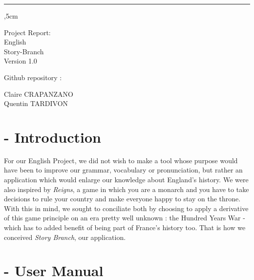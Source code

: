 \documentclass{scrreprt}
\date{}
\def\myversion{1.0}
\begin{document}
%
\thispagestyle{empty}
\begin{flushright}
    \rule{15cm}{3pt},5cm
    \begin{bfseries}
        \Huge{Project Report: \\ English}\\
        \vspace{2cm}
        \vspace{2cm}
        \Huge{Story-Branch}\\

        \vspace{0.5cm}
        \LARGE{Version \myversion}\\
        \begin{flushleft}
            \vspace{8cm}
            Github repository : \href{https://github.com/quentin-tardivon/Story-Branch}{\faGithub}~\\
            \vspace{0.5cm}

            Claire CRAPANZANO\\
            Quentin TARDIVON\\
        \end{flushleft}
    \end{bfseries}
\end{flushright}

\tableofcontents

\setcounter{page}{0}

\chapter{- Introduction}

For our English Project, we did not wish to make a tool whose purpose would have been to improve our grammar, vocabulary or pronunciation, but rather an application which would enlarge our knowledge about England's history. We were also inspired by \textit{Reigns}, a game in which you are a monarch and you have to take decisions to rule your country and make everyone happy to stay on the throne.
With this in mind, we sought to conciliate both by choosing to apply a derivative of this game principle on an era pretty well unknown : the Hundred Years War - which has to added benefit of being part of France's history too. That is how we conceived \textit{Story Branch}, our application. 

{\let\clearpage\relax \chapter{- User Manual}}
\end{document}
